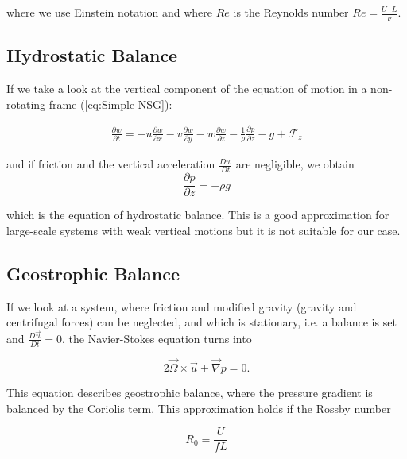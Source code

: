\documentclass[12pt, a4paper, twoside]{article}
\begin{document}
			where we use Einstein notation and where $Re$ is the Reynolds number $Re = \frac{U\cdot L}{\nu}$.
	
	\subsection{Hydrostatic Balance} %
		If we take a look at the vertical component of the equation of motion in a non-rotating frame (\ref{eq:Simple NSG}):
		
		\begin{eqnarray}
		\frac{\partial w}{\partial t} = - u \frac{\partial w}{\partial x} - v \frac{\partial w}{\partial y} - w \frac{\partial w}{\partial z} - \frac{1}{\rho} \frac{\partial p}{\partial z} - g + \mathcal{F}_z
		\label{eq:Simple NSG z}
		\end{eqnarray}
		
		and if friction and the vertical acceleration $\frac{Dw}{Dt}$ are negligible, we obtain
		\begin{equation}
		\frac{\partial p}{\partial z} = -\rho g
		\label{eq:Hydrostat Balance}
		\end{equation}
	
		which is the equation of hydrostatic balance. This is a good approximation for large-scale systems with weak vertical motions but it is not suitable for our case.
		
	\subsection{Geostrophic Balance}
		If we look at a system, where friction and modified gravity (gravity and centrifugal forces) can be neglected, and which is stationary, i.e. a balance is set and $\frac{D\vec{u}}{Dt}=0$, the Navier-Stokes equation turns into
		
		\begin{equation}
			2\vec{\Omega} \times \vec{u} + \vec{\nabla} p = 0 .
			\label{eq:Geostrophic Balance}
		\end{equation}
		
		This equation describes geostrophic balance, where the pressure gradient is balanced by the Coriolis term. This approximation holds if the Rossby number 
		
		\begin{equation}
			R_0 = \frac{U}{f L}
			\label{eq:Rossby Number}
		\end{equation}
		
\end{document}
